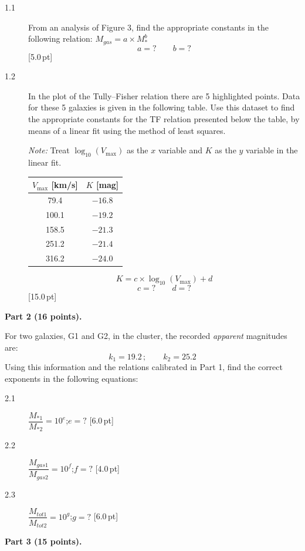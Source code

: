 \begin{description}
\item[1.1] From an analysis of Figure 3, find the appropriate constants in the
  following relation: $M_{gas} = a \times M_*^b$
  \[ a = ?\qquad b = ? \]
  \hfill[5.0\,pt]
\item[1.2] In the plot of the Tully--Fisher relation there are 5 highlighted
  points. Data for these 5 galaxies is given in the following table. Use this
  dataset to find the appropriate constants for the TF relation presented
  below the table, by means of a linear fit using the method of least
  squares.

  \emph{Note:} Treat $\log_{10}(V_{\max})$ as the $x$ variable and $K$ as the
  $y$ variable in the linear fit.

  \begin{center}
  \begin{tabular}{cc}
  $V_{\max}$ [km/s] & $K$ [mag] \\
  \hline
   79.4 & $-16.8$ \\
  100.1 & $-19.2$ \\
  158.5 & $-21.3$ \\
  251.2 & $-21.4$ \\
  316.2 & $-24.0$ \\
  \end{tabular}
  \end{center}

  \[ K = c \times \log_{10}(V_{\max}) + d \]
  \[ c = ?\qquad d = ? \]
  \hfill[15.0\,pt]
\end{description}

\medskip
\textbf{Part 2 (16 points).}

For two galaxies, G1 and G2, in the cluster, the recorded \emph{apparent}
magnitudes are:
\[ k_1 = 19.2\,;\qquad k_2 = 25.2 \]
Using this information and the relations calibrated in Part 1, find the
correct exponents in the following equations:

\begin{description}
\item[2.1] $\dfrac{M_{*1}}{M_{*2}} = 10^e$;\quad $e = ?$ \hfill[6.0\,pt]
\item[2.2] $\dfrac{M_{gas1}}{M_{gas2}} = 10^f$;\quad $f = ?$ \hfill[4.0\,pt]
\item[2.3] $\dfrac{M_{tot1}}{M_{tot2}} = 10^g$;\quad $g = ?$ \hfill[6.0\,pt]
\end{description}

\medskip
\textbf{Part 3 (15 points).}

